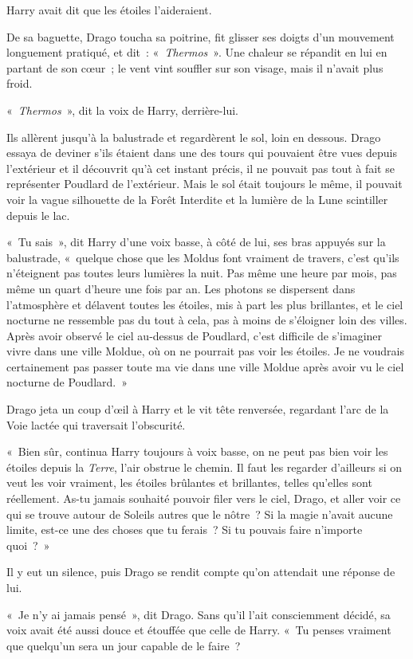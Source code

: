 Harry avait dit que les étoiles l'aideraient.

De sa baguette, Drago toucha sa poitrine, fit glisser ses doigts d'un mouvement longuement pratiqué, et dit~: «~\emph{Thermos}~».
Une chaleur se répandit en lui en partant de son cœur~; le vent vint souffler sur son visage, mais il n'avait plus froid.

«~\emph{Thermos}~», dit la voix de Harry, derrière-lui.

Ils allèrent jusqu'à la balustrade et regardèrent le sol, loin en dessous.
Drago essaya de deviner s'ils étaient dans une des tours qui pouvaient être vues depuis l'extérieur et il découvrit qu'à cet instant précis, il ne pouvait pas tout à fait se représenter Poudlard de l'extérieur.
Mais le sol était toujours le même, il pouvait voir la vague silhouette de la Forêt Interdite et la lumière de la Lune scintiller depuis le lac.

«~Tu sais~», dit Harry d'une voix basse, à côté de lui, ses bras appuyés sur la balustrade, «~quelque chose que les Moldus font vraiment de travers, c'est qu'ils n'éteignent pas toutes leurs lumières la nuit.
Pas même une heure par mois, pas même un quart d'heure une fois par an.
Les photons se dispersent dans l'atmosphère et délavent toutes les étoiles, mis à part les plus brillantes, et le ciel nocturne ne ressemble pas du tout à cela, pas à moins de s'éloigner loin des villes.
Après avoir observé le ciel au-dessus de Poudlard, c'est difficile de s'imaginer vivre dans une ville Moldue, où on ne pourrait pas voir les étoiles.
Je ne voudrais certainement pas passer toute ma vie dans une ville Moldue après avoir vu le ciel nocturne de Poudlard.~»

Drago jeta un coup d'œil à Harry et le vit tête renversée, regardant l'arc de la Voie lactée qui traversait l'obscurité.

«~Bien sûr, continua Harry toujours à voix basse, on ne peut pas bien voir les étoiles depuis la \emph{Terre}, l'air obstrue le chemin.
Il faut les regarder d'ailleurs si on veut les voir vraiment, les étoiles brûlantes et brillantes, telles qu'elles sont réellement.
As-tu jamais souhaité pouvoir filer vers le ciel, Drago, et aller voir ce qui se trouve autour de Soleils autres que le nôtre~?
Si la magie n'avait aucune limite, est-ce une des choses que tu ferais~?
Si tu pouvais faire n'importe quoi~?~»

Il y eut un silence, puis Drago se rendit compte qu'on attendait une réponse de lui.

«~Je n'y ai jamais pensé~», dit Drago.
Sans qu'il l'ait consciemment décidé, sa voix avait été aussi douce et étouffée que celle de Harry.
«~Tu penses vraiment que quelqu'un sera un jour capable de le faire~?

